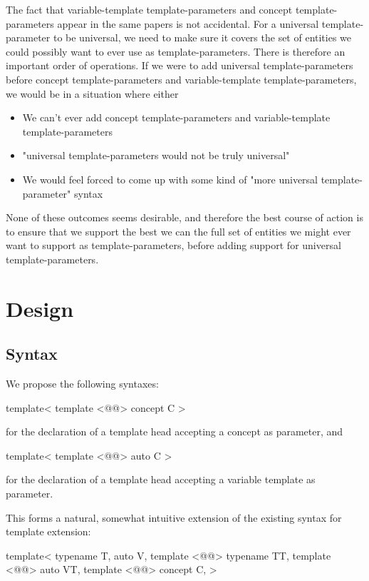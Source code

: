 \documentclass{wg21}
\begin{document}
The fact that variable-template template-parameters and concept template-parameters appear in the same papers is not accidental.
For a universal template-parameter to be universal, we need to make sure it covers the set of entities we could possibly want to ever use as template-parameters.
There is therefore an important order of operations.
If we were to add universal template-parameters before concept template-parameters and variable-template template-parameters, we would be in a situation where either
\begin{itemize}
\item We can't ever add concept template-parameters and variable-template template-parameters
\item "universal template-parameters would not be truly universal"
\item We would feel forced to come up with some kind of "more universal template-parameter" syntax
\end{itemize}

None of these outcomes seems desirable, and therefore the best course of action is to ensure that we
support the best we can the full set of entities we might ever want to support as template-parameters, before adding support for universal template-parameters.

\section{Design}

\subsection{Syntax}

We propose the following syntaxes:

\begin{colorblock}
template<
    template <@@> concept C
>
\end{colorblock}

for the declaration of a template head accepting a concept as parameter, and

\begin{colorblock}
template<
    template <@@> auto C
>
\end{colorblock}

for the declaration of a template head accepting a variable template as parameter.

This forms a natural, somewhat intuitive extension of the existing syntax for template extension:
\begin{colorblock}
template<
    typename T,
    auto V,
    template <@@> typename TT,
    template <@@> auto VT,
    template <@@> concept C,
>
\end{colorblock}
\end{document}

